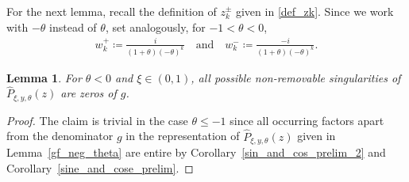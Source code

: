 \documentclass[10pt,a4paper]{amsart}
\newcommand{\1}{\mathds{1}}
\newtheorem{Lemma}[definition]{Lemma}
\begin{document}
For the next lemma, recall the definition of $z_k^\pm$ given in \eqref{def_zk}. Since we work with $-\theta$ instead of $\theta$, set analogously, for $-1<\theta<0$,
\begin{align*}
       w_k^+\coloneqq \frac{i}{(1+\theta)(-\theta)^k}\quad\text{and}\quad w_k^-\coloneqq \frac{-i}{(1+\theta)(-\theta)^k}.
   \end{align*}
\begin{Lemma}\label{poles_hatP_theta}
      For $\theta<0$ and $\xi\in(0,1)$, all possible non-removable singularities of $\hat{P}_{\xi,y,\theta}(z)$ are zeros of $g$. 
\end{Lemma}
\begin{proof} 
The claim is trivial in the case $\theta\le-1$ since all occurring factors apart from the denominator $g$ in the representation of $\hat{P}_{\xi,y,\theta}(z)$ given in Lemma~\ref{gf_neg_theta} are entire by Corollary~\ref{sin_and_cos_prelim_2} and Corollary~\ref{sine_and_cose_prelim}. 


\end{proof}
\end{document}
